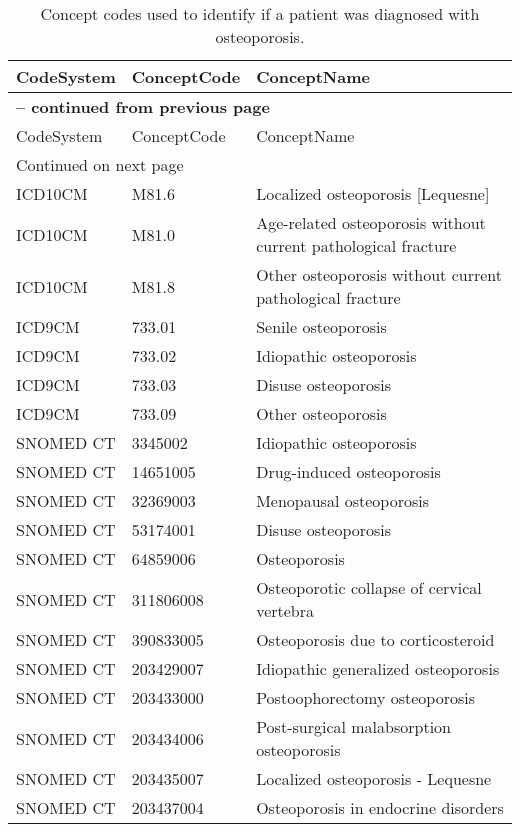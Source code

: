 \begin{longtable}{p{}p{}p{}}
\caption{Concept codes used to identify if a patient was diagnosed with osteoporosis.} \\ 
 CodeSystem & ConceptCode & ConceptName \\ 
  \hline 
\endfirsthead 
\multicolumn{3}{p{\textwidth}}{{ \bfseries \tablename \thetable{} -- continued from previous page}} \\ 
\hline CodeSystem & ConceptCode & ConceptName \\ \hline 
\endhead 
\hline \multicolumn{3}{p{\textwidth}}{{Continued on next page}} \\ \hline 
\endfoot 
\hline 
\endlastfoot 
 \hline
ICD10CM & M81.6 & Localized osteoporosis [Lequesne] \\ 
  ICD10CM & M81.0 & Age-related osteoporosis without current pathological fracture \\ 
  ICD10CM & M81.8 & Other osteoporosis without current pathological fracture \\ 
  ICD9CM & 733.01 & Senile osteoporosis \\ 
  ICD9CM & 733.02 & Idiopathic osteoporosis \\ 
  ICD9CM & 733.03 & Disuse osteoporosis \\ 
  ICD9CM & 733.09 & Other osteoporosis \\ 
  SNOMED CT & 3345002 & Idiopathic osteoporosis \\ 
  SNOMED CT & 14651005 & Drug-induced osteoporosis \\ 
  SNOMED CT & 32369003 & Menopausal osteoporosis \\ 
  SNOMED CT & 53174001 & Disuse osteoporosis \\ 
  SNOMED CT & 64859006 & Osteoporosis \\ 
  SNOMED CT & 311806008 & Osteoporotic collapse of cervical vertebra \\ 
  SNOMED CT & 390833005 & Osteoporosis due to corticosteroid \\ 
  SNOMED CT & 203429007 & Idiopathic generalized osteoporosis \\ 
  SNOMED CT & 203433000 & Postoophorectomy osteoporosis \\ 
  SNOMED CT & 203434006 & Post-surgical malabsorption osteoporosis \\ 
  SNOMED CT & 203435007 & Localized osteoporosis - Lequesne \\ 
  SNOMED CT & 203437004 & Osteoporosis in endocrine disorders \\ 

\end{longtable}
